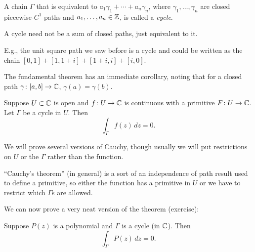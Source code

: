 \documentclass[10pt,aspectratio=169]{beamer}
\begin{document}
\begin{frame}

\begin{definition}
A chain $\Gamma$ that is equivalent to
$a_1 \gamma_1 + \cdots + a_n \gamma_n$, where $\gamma_1, \ldots, \gamma_n$
are closed piecewise-$C^1$ paths
and $a_1,\ldots,a_n \in {\mathbb{Z}}$,
is called a \emph{cycle}.
\end{definition}

\pause

A cycle need not be a sum of closed paths, just equivalent to it.
\pause

E.g., the unit square path we saw before is a cycle and could be written
as the chain
$[0,1] + [1,1+i]+[1+i,i]+[i,0]$.

\pause
\medskip

The fundamental theorem has an immediate corollary, noting that
for a closed path $\gamma \colon[a,b] \to {\mathbb{C}}$, $\gamma(a)=\gamma(b)$.

\pause

\begin{corollary}
Suppose $U \subset {\mathbb{C}}$ is open and $f \colon U \to {\mathbb{C}}$
is continuous with a primitive
$F \colon U \to {\mathbb{C}}$.
Let $\Gamma$ be
a cycle
in $U$.
Then
\begin{equation*}
\int_\Gamma f(z) \, dz = 0 .
\end{equation*}
\end{corollary}

\end{frame}

\begin{frame}
We will prove several versions of Cauchy, though usually we will put
restrictions on $U$ or the $\Gamma$ rather than the function.

\medskip
\pause

``Cauchy's theorem'' (in general) is a sort of an independence of path result
used to define a primitive,
so either the function has a primitive in $U$
or we have to restrict which $\Gamma$s are allowed.

\pause
\medskip

We can now prove a very neat version of the theorem (exercise):

\begin{corollary}
Suppose $P(z)$ is a polynomial and $\Gamma$ is
a cycle (in ${\mathbb{C}}$).
Then
\begin{equation*}
\int_\Gamma P(z) \, dz = 0 .
\end{equation*}
\end{corollary}
\end{frame}
\end{document}
